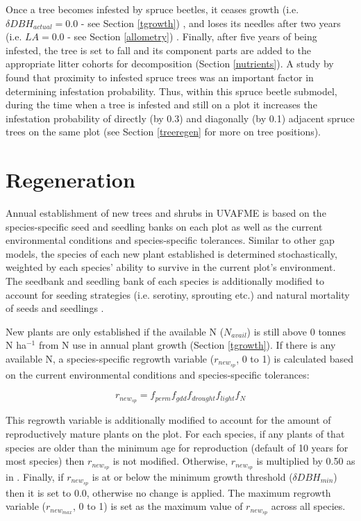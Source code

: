 \documentclass[a4paper, 12pt] {report}
\begin{document}
Once a tree becomes infested by spruce beetles, it ceases growth (i.e. $\delta DBH_{actual} = 0.0$ - see Section {\ref{tgrowth}}) , and loses its needles after two years (i.e. $LA = 0.0$ - see Section \ref{allometry}) \cite{schmidSpruceBeetleRockies1977}. Finally, after five years of being infested, the tree is set to fall and its component parts are added to the appropriate litter cohorts for decomposition (Section \ref{nutrients}). A study by  found that proximity to infested spruce trees was an important factor in determining infestation probability. Thus, within this spruce beetle submodel, during the time when a tree is infested and still on a plot it increases the infestation probability of directly (by 0.3) and diagonally (by 0.1) adjacent spruce trees on the same plot (see Section \ref{treeregen} for more on tree positions). 

\section{Regeneration} \label{regen}

Annual establishment of new trees and shrubs in UVAFME is based on the species-specific seed and seedling banks on each plot as well as the current environmental conditions and species-specific tolerances. Similar to other gap models, the species of each new plant established is determined stochastically, weighted by each species' ability to survive in the current plot's environment. The seedbank and seedling bank of each species is additionally modified to account for seeding strategies (i.e. serotiny, sprouting etc.) and natural mortality of seeds and seedlings \cite{yanFAREASTForestGap2005}.

New plants are only established if the available N ($N_{avail}$) is still above 0 tonnes N ha$^{-1}$ from N use in annual plant growth (Section \ref{tgrowth}). If there is any available N, a species-specific regrowth variable ($r_{new_{sp}}$, 0 to 1) is calculated based on the current environmental conditions and species-specific tolerances:

\begin{equation} \label{rnew}
r_{new_{sp}} =  f_{perm}f_{gdd}f_{drought}f_{light}f_{N}
\end{equation}

This regrowth variable is additionally modified to account for the amount of reproductively mature plants on the plot. For each species, if any plants of that species are older than the minimum age for reproduction (default of 10 years for most species) then $r_{new_{sp}}$ is not modified. Otherwise, $r_{new_{sp}}$ is multiplied by 0.50 as in . Finally, if $r_{new_{sp}}$ is at or below the minimum growth threshold ($\delta DBH_{min}$) then it is set to 0.0, otherwise no change is applied. The maximum regrowth variable ($r_{new_{max}}$, 0 to 1) is set as the maximum value of $r_{new_{sp}}$ across all species.
\end{document}
